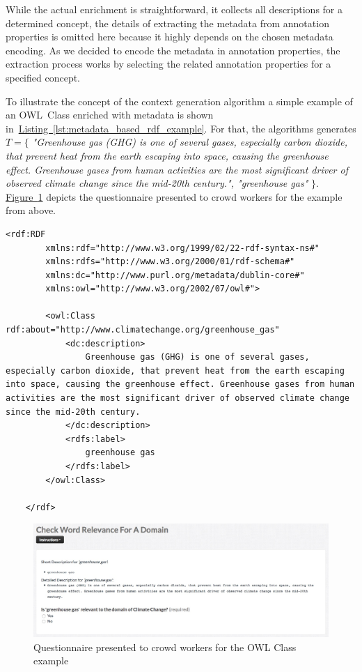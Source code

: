 While the actual enrichment is straightforward, it collects all descriptions for a determined concept, the details of extracting the metadata from annotation properties is omitted here because it highly depends on the chosen metadata encoding.
As we decided to encode the metadata in annotation properties, the extraction process works by selecting the related annotation properties for a specified concept. 

To illustrate the concept of the context generation algorithm a simple example of an OWL~Class enriched with metadata is shown in~\hyperref[lst:metadata_based_rdf_example]{Listing~\ref*{lst:metadata_based_rdf_example}}.
For that, the algorithms generates $T=\{$ \emph{"Greenhouse gas (GHG) is one of several gases, especially carbon dioxide, that prevent heat from the earth escaping into space, causing the greenhouse effect. Greenhouse gases from human activities are the most significant driver of observed climate change since the mid-20th century.", "greenhouse gas"} $\}$. 
\hyperref[fig:metadata_rdf_example_questionaire]{Figure~\ref*{fig:metadata_rdf_example_questionaire}} depicts the questionnaire presented to crowd workers for the example from above. 

\begin{lstlisting}[frame=single,breaklines=true,postbreak=\mbox{\textcolor{black}{$\hookrightarrow$}\space},caption=An OWL Class enriched with metadata,label=lst:metadata_based_rdf_example]
	<rdf:RDF
		xmlns:rdf="http://www.w3.org/1999/02/22-rdf-syntax-ns#"
		xmlns:rdfs="http://www.w3.org/2000/01/rdf-schema#"
		xmlns:dc="http://www.purl.org/metadata/dublin-core#"
		xmlns:owl="http://www.w3.org/2002/07/owl#">
		
		<owl:Class rdf:about="http://www.climatechange.org/greenhouse_gas"
			<dc:description>
				Greenhouse gas (GHG) is one of several gases, especially carbon dioxide, that prevent heat from the earth escaping into space, causing the greenhouse effect. Greenhouse gases from human activities are the most significant driver of observed climate change since the mid-20th century.
			</dc:description>
			<rdfs:label>
				greenhouse gas
			</rdfs:label>
		</owl:Class>
		
	</rdf>
\end{lstlisting}

\begin{figure}
	 \centering
	 \includegraphics[width=\textwidth]{screenshots/questionaire_metadata_example}
	 \caption{Questionnaire presented to crowd workers for the OWL Class example}\label{fig:metadata_rdf_example_questionaire}
\end{figure}
